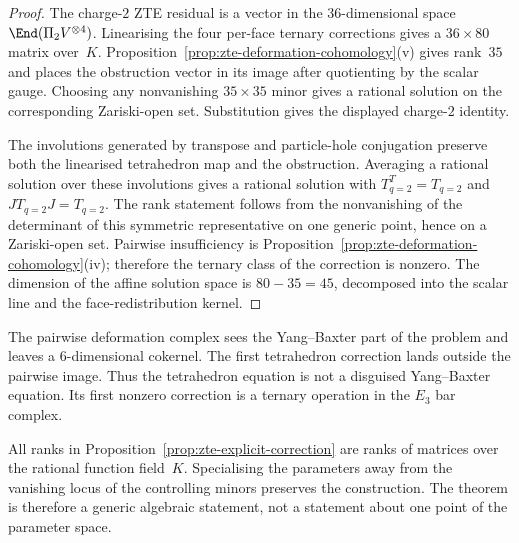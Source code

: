 \begin{proof}
The charge-$2$ ZTE residual is a vector in the $36$-dimensional space
$\End(\Pi_2V^{\otimes4})$. Linearising the four per-face ternary
corrections gives a $36\times80$ matrix over~$K$. Proposition~\ref{prop:zte-deformation-cohomology}(v) gives rank~$35$ and places the obstruction vector in its image after quotienting by the scalar gauge. Choosing any nonvanishing $35\times35$ minor gives a rational solution on the corresponding Zariski-open set. Substitution gives the displayed charge-$2$ identity.

The involutions generated by transpose and particle-hole conjugation preserve both the linearised tetrahedron map and the obstruction. Averaging a rational solution over these involutions gives a rational solution with $T_{q=2}^T=T_{q=2}$ and $JT_{q=2}J=T_{q=2}$. The rank statement follows from the nonvanishing of the determinant of this symmetric representative on one generic point, hence on a Zariski-open set. Pairwise insufficiency is Proposition~\ref{prop:zte-deformation-cohomology}(iv); therefore the ternary class of the correction is nonzero. The dimension of the affine solution space is $80-35=45$, decomposed into the scalar line and the face-redistribution kernel.
\end{proof}

\begin{remark}
\label{rem:zte-factorizability-interpretation}
The pairwise deformation complex sees the Yang--Baxter part of the problem and leaves a $6$-dimensional cokernel. The first tetrahedron correction lands outside the pairwise image. Thus the tetrahedron equation is not a disguised Yang--Baxter equation. Its first nonzero correction is a ternary operation in the $E_3$ bar complex.
\end{remark}

\begin{remark}
\label{rem:zte-newton-convergence}
All ranks in Proposition~\ref{prop:zte-explicit-correction} are ranks of matrices over the rational function field~$K$. Specialising the parameters away from the vanishing locus of the controlling minors preserves the construction. The theorem is therefore a generic algebraic statement, not a statement about one point of the parameter space.
\end{remark}

